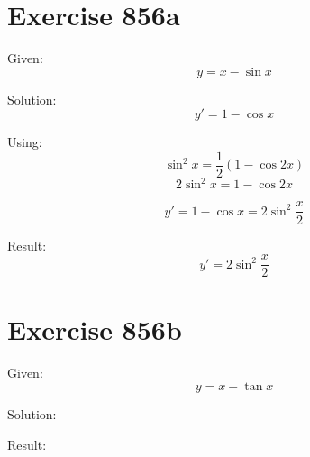 \documentclass[a4paper, 10pt]{scrartcl}
\begin{document}
\section{Exercise 856a}

Given:
\[
y = x - \sin{x}
\]

Solution:
\[
y' = 1 - \cos{x}
\]

Using:
\[
\sin^{2}{x} = \frac{1}{2}(1 - \cos{2x})
\]
\[
2\sin^{2}{x} = 1 - \cos{2x}
\]

\[
y' = 1 - \cos{x} = 2\sin^{2}{\frac{x}{2}}
\]

Result:
\[
y' = 2\sin^{2}{\frac{x}{2}}
\]

\section{Exercise 856b}

Given:
\[
y = x - \tan{x}
\]

Solution:

Result:
\end{document}
